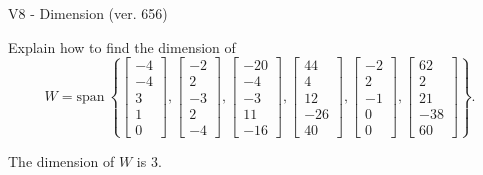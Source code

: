 \begin{exercise}
  \begin{exerciseTitle}V8 - Dimension (ver. 656)\end{exerciseTitle}
  \begin{exerciseStatement}
    Explain how to find the dimension of 
\[W=\mathrm{span}\ \left\{\left[\begin{array}{r}
-4 \\
-4 \\
3 \\
1 \\
0
\end{array}\right] , \left[\begin{array}{r}
-2 \\
2 \\
-3 \\
2 \\
-4
\end{array}\right] , \left[\begin{array}{r}
-20 \\
-4 \\
-3 \\
11 \\
-16
\end{array}\right] , \left[\begin{array}{r}
44 \\
4 \\
12 \\
-26 \\
40
\end{array}\right] , \left[\begin{array}{r}
-2 \\
2 \\
-1 \\
0 \\
0
\end{array}\right] , \left[\begin{array}{r}
62 \\
2 \\
21 \\
-38 \\
60
\end{array}\right]\right\}.\]



  \end{exerciseStatement}
  \begin{exerciseAnswer}
   The dimension of \(W\) is  \(3\).
  


  \end{exerciseAnswer}
\end{exercise}